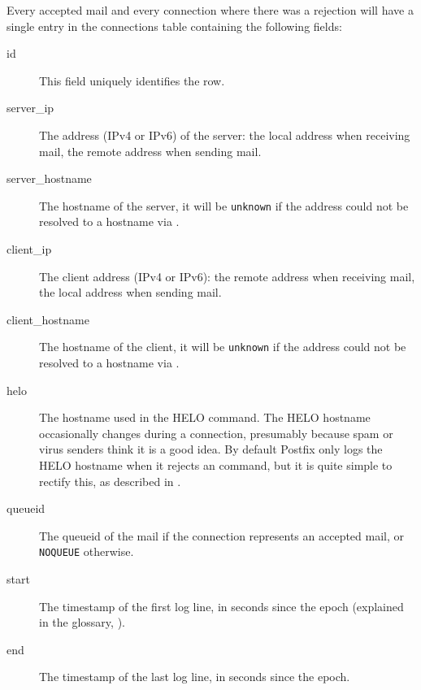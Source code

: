 \label{connections table}

Every accepted mail and every connection where there was a rejection will
have a single entry in the connections table containing the following
fields:

\begin{description}

    \item [id] This field uniquely identifies the row.

    \item [server\_ip] The \IP{} address (IPv4 or IPv6) of the server: the
        local address when receiving mail, the remote address when sending
        mail.

    \item [server\_hostname] The hostname of the server, it will be
        \texttt{unknown} if the \IP{} address could not be resolved to a
        hostname via \DNS{}\@.

    \item [client\_ip] The client \IP{} address (IPv4 or IPv6): the remote
        address when receiving mail, the local address when sending mail.

    \item [client\_hostname] The hostname of the client, it will be
        \texttt{unknown} if the \IP{} address could not be resolved to a
        hostname via \DNS{}\@.

    \item [helo] The hostname used in the HELO command.  The HELO hostname
        occasionally changes during a connection, presumably because spam
        or virus senders think it is a good idea.  By default Postfix only
        logs the HELO hostname when it rejects an \SMTP{} command, but it
        is quite simple to rectify this, as described in
        .

    \item [queueid] The queueid of the mail if the connection represents an
        accepted mail, or \texttt{NOQUEUE} otherwise.

    \item [start] The timestamp of the first log line, in seconds since the
        epoch (explained in the glossary, ).

    \item [end] The timestamp of the last log line, in seconds since the
        epoch.

\end{description}

